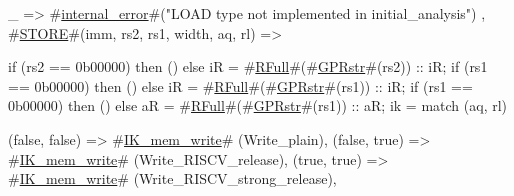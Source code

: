 {{{{                 _  => #\hyperref[sailRISCVzinternalzyerror]{internal\_error}#("LOAD type not implemented in initial_analysis")
               }
      },
      #\hyperref[sailRISCVzSTORE]{STORE}#(imm, rs2, rs1, width, aq, rl) => {
             if (rs2 == 0b00000) then () else iR = #\hyperref[sailRISCVzRFull]{RFull}#(#\hyperref[sailRISCVzGPRstr]{GPRstr}#(rs2)) :: iR;
             if (rs1 == 0b00000) then () else iR = #\hyperref[sailRISCVzRFull]{RFull}#(#\hyperref[sailRISCVzGPRstr]{GPRstr}#(rs1)) :: iR;
             if (rs1 == 0b00000) then () else aR = #\hyperref[sailRISCVzRFull]{RFull}#(#\hyperref[sailRISCVzGPRstr]{GPRstr}#(rs1)) :: aR;
             ik =
               match (aq, rl) {
                 (false, false) => #\hyperref[sailRISCVzIKzymemzywrite]{IK\_mem\_write}# (Write_plain),
                 (false, true)  => #\hyperref[sailRISCVzIKzymemzywrite]{IK\_mem\_write}# (Write_RISCV_release),
                 (true,  true)  => #\hyperref[sailRISCVzIKzymemzywrite]{IK\_mem\_write}# (Write_RISCV_strong_release),

}}}}
